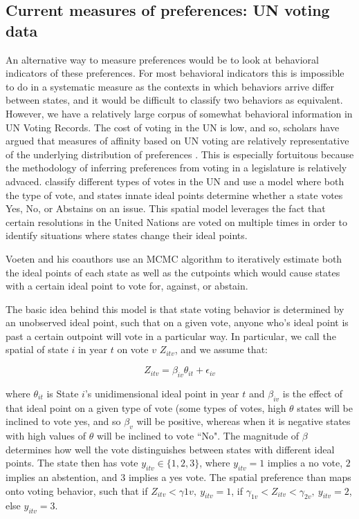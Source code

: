 \subsection{Current measures of preferences: UN voting data}
An alternative way to measure preferences would be to look at behavioral indicators of these preferences. For most behavioral indicators this is impossible to do in a systematic measure as the contexts in which behaviors arrive differ between states, and it would be difficult to classify two behaviors as equivalent. However, we have a relatively large corpus of somewhat behavioral information in UN Voting Records. The cost of voting in the UN is low, and so, scholars have argued that measures of affinity based on UN voting are relatively representative of the underlying distribution of preferences \citep{gartzke:1998}. This is especially fortuitous because the methodology of inferring preferences from voting in a legislature is relatively advaced. \citet{voeten} classify different types of votes in the UN and use a model where both the type of vote, and states innate ideal points determine whether a state votes Yes, No, or Abstains on an issue. This spatial model leverages the fact that certain resolutions in the United Nations are voted on multiple times in order to identify situations where states change their ideal points.

Voeten and his coauthors use an MCMC algorithm to iteratively estimate both the ideal points of each state as well as the cutpoints which would cause states with a certain ideal point to vote for, against, or abstain.

The basic idea behind this model is that state voting behavior is determined by an unobserved ideal point, such that on a given vote, anyone who's ideal point is past a certain outpoint will vote in a particular way. In particular, we call the spatial of  state $i$ in year $t$  on vote $v$ $Z_{itv} $, and we assume that:

\begin{equation}
Z_{itv} = \beta_{iv}\theta_{it} + \epsilon_{iv}
\end{equation}

where $\theta_{it}$ is State $i$'s unidimensional ideal point in year $t$ and $\beta_{iv}$ is the effect of that ideal point on a given type of vote (some types of votes, high $\theta$ states will be inclined to vote yes, and so $\beta_{v}$ will be positive, whereas when it is negative states with high values of $\theta$ will be inclined to vote ``No". The magnitude of $\beta$ determines how well the vote distinguishes between states with different ideal points. The state then has vote $y_{itv} \in \{1,2,3\}$, where $y_{itv} = 1$ implies a no vote, $2$ implies an abstention, and $3$ implies a yes vote. The spatial preference than maps onto voting behavior, such that if $Z_{itv} < \gamma{1v}, ~y_{itv} = 1$, if $\gamma_{1v}<Z_{itv}<\gamma_{2v},~ y_{itv} = 2$, else $y_{itv} = 3$. 

